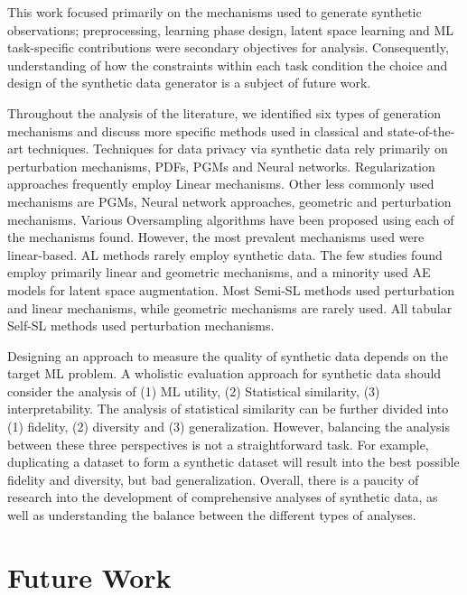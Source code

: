 This work focused primarily on the mechanisms used to generate synthetic
observations; preprocessing, learning phase design, latent space learning and
ML task-specific contributions were secondary objectives for analysis.
Consequently, understanding of how the constraints within each task condition
the choice and design of the synthetic data generator is a subject of future
work.

Throughout the analysis of the literature, we identified six types of
generation mechanisms and discuss more specific methods used in classical and
state-of-the-art techniques. Techniques for data privacy via synthetic data
rely primarily on perturbation mechanisms, PDFs, PGMs and Neural networks.
Regularization approaches frequently employ Linear mechanisms. Other less
commonly used mechanisms are PGMs, Neural network approaches, geometric and
perturbation mechanisms. Various Oversampling algorithms have been proposed
using each of the mechanisms found. However, the most prevalent mechanisms
used were linear-based. AL methods rarely employ synthetic data. The few
studies found employ primarily linear and geometric mechanisms, and a minority
used AE models for latent space augmentation. Most Semi-SL methods used
perturbation and linear mechanisms, while geometric mechanisms are rarely
used. All tabular Self-SL methods used perturbation mechanisms. 

Designing an approach to measure the quality of synthetic data depends on the
target ML problem. A wholistic evaluation approach for synthetic data should
consider the analysis of (1) ML utility, (2) Statistical similarity, (3)
interpretability. The analysis of statistical similarity can be further
divided into (1) fidelity, (2) diversity and (3) generalization.  However,
balancing the analysis between these three perspectives is not a
straightforward task. For example, duplicating a dataset to form a synthetic
dataset will result into the best possible fidelity and diversity, but bad
generalization. Overall, there is a paucity of research into the development
of comprehensive analyses of synthetic data, as well as understanding the
balance between the different types of analyses.

\section{Future Work}\label{sec:future-work-synth}

